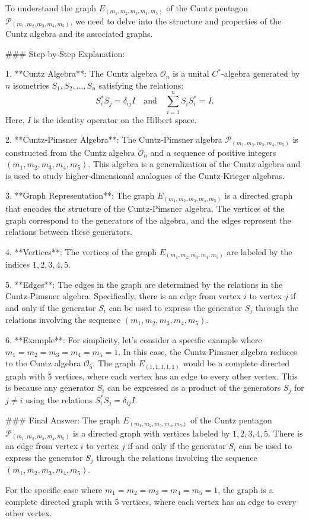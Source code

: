 To understand the graph \( E_{(m_1, m_2, m_3, m_4, m_5)} \) of the Cuntz pentagon \(\mathcal{P}_{(m_1, m_2, m_3, m_4, m_5)}\), we need to delve into the structure and properties of the Cuntz algebra and its associated graphs.

### Step-by-Step Explanation:

1. **Cuntz Algebra**:
   The Cuntz algebra \(\mathcal{O}_n\) is a unital \(C^*\)-algebra generated by \(n\) isometries \(S_1, S_2, \ldots, S_n\) satisfying the relations:
   \[
   S_i^* S_j = \delta_{ij} I \quad \text{and} \quad \sum_{i=1}^n S_i S_i^* = I.
   \]
   Here, \(I\) is the identity operator on the Hilbert space.

2. **Cuntz-Pimsner Algebra**:
   The Cuntz-Pimsner algebra \(\mathcal{P}_{(m_1, m_2, m_3, m_4, m_5)}\) is constructed from the Cuntz algebra \(\mathcal{O}_n\) and a sequence of positive integers \((m_1, m_2, m_3, m_4, m_5)\). This algebra is a generalization of the Cuntz algebra and is used to study higher-dimensional analogues of the Cuntz-Krieger algebras.

3. **Graph Representation**:
   The graph \( E_{(m_1, m_2, m_3, m_4, m_5)} \) is a directed graph that encodes the structure of the Cuntz-Pimsner algebra. The vertices of the graph correspond to the generators of the algebra, and the edges represent the relations between these generators.

4. **Vertices**:
   The vertices of the graph \( E_{(m_1, m_2, m_3, m_4, m_5)} \) are labeled by the indices \(1, 2, 3, 4, 5\).

5. **Edges**:
   The edges in the graph are determined by the relations in the Cuntz-Pimsner algebra. Specifically, there is an edge from vertex \(i\) to vertex \(j\) if and only if the generator \(S_i\) can be used to express the generator \(S_j\) through the relations involving the sequence \((m_1, m_2, m_3, m_4, m_5)\).

6. **Example**:
   For simplicity, let's consider a specific example where \(m_1 = m_2 = m_3 = m_4 = m_5 = 1\). In this case, the Cuntz-Pimsner algebra reduces to the Cuntz algebra \(\mathcal{O}_5\). The graph \( E_{(1, 1, 1, 1, 1)} \) would be a complete directed graph with 5 vertices, where each vertex has an edge to every other vertex. This is because any generator \(S_i\) can be expressed as a product of the generators \(S_j\) for \(j \neq i\) using the relations \(S_i^* S_j = \delta_{ij} I\).

### Final Answer:
The graph \( E_{(m_1, m_2, m_3, m_4, m_5)} \) of the Cuntz pentagon \(\mathcal{P}_{(m_1, m_2, m_3, m_4, m_5)}\) is a directed graph with vertices labeled by \(1, 2, 3, 4, 5\). There is an edge from vertex \(i\) to vertex \(j\) if and only if the generator \(S_i\) can be used to express the generator \(S_j\) through the relations involving the sequence \((m_1, m_2, m_3, m_4, m_5)\).

For the specific case where \(m_1 = m_2 = m_3 = m_4 = m_5 = 1\), the graph is a complete directed graph with 5 vertices, where each vertex has an edge to every other vertex.